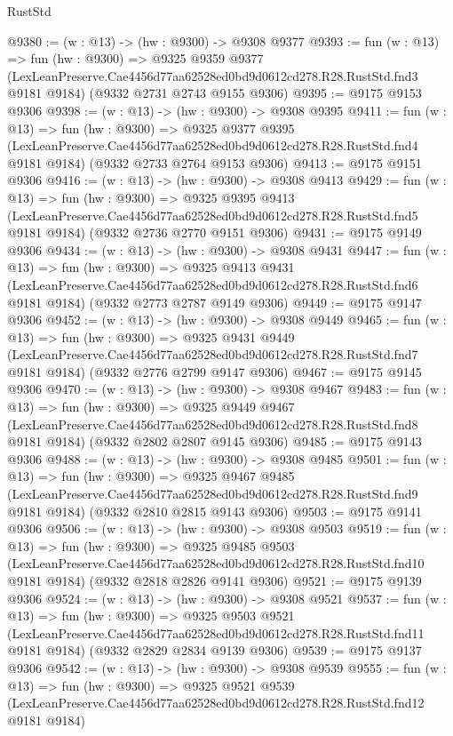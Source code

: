 \begin{lexlean}{RustStd}
\begin{coremodule}
@9380 := (w : @13) -> (hw : @9300) -> @9308 @9377
@9393 := fun (w : @13) =>
  fun (hw : @9300) =>
  @9325
    @9359
    @9377
    (LexLeanPreserve.Cae4456d77aa62528ed0bd9d0612cd278.R28.RustStd.fnd3 @9181 @9184)
    (@9332 @2731 @2743 @9155 @9306)
@9395 := @9175 @9153 @9306
@9398 := (w : @13) -> (hw : @9300) -> @9308 @9395
@9411 := fun (w : @13) =>
  fun (hw : @9300) =>
  @9325
    @9377
    @9395
    (LexLeanPreserve.Cae4456d77aa62528ed0bd9d0612cd278.R28.RustStd.fnd4 @9181 @9184)
    (@9332 @2733 @2764 @9153 @9306)
@9413 := @9175 @9151 @9306
@9416 := (w : @13) -> (hw : @9300) -> @9308 @9413
@9429 := fun (w : @13) =>
  fun (hw : @9300) =>
  @9325
    @9395
    @9413
    (LexLeanPreserve.Cae4456d77aa62528ed0bd9d0612cd278.R28.RustStd.fnd5 @9181 @9184)
    (@9332 @2736 @2770 @9151 @9306)
@9431 := @9175 @9149 @9306
@9434 := (w : @13) -> (hw : @9300) -> @9308 @9431
@9447 := fun (w : @13) =>
  fun (hw : @9300) =>
  @9325
    @9413
    @9431
    (LexLeanPreserve.Cae4456d77aa62528ed0bd9d0612cd278.R28.RustStd.fnd6 @9181 @9184)
    (@9332 @2773 @2787 @9149 @9306)
@9449 := @9175 @9147 @9306
@9452 := (w : @13) -> (hw : @9300) -> @9308 @9449
@9465 := fun (w : @13) =>
  fun (hw : @9300) =>
  @9325
    @9431
    @9449
    (LexLeanPreserve.Cae4456d77aa62528ed0bd9d0612cd278.R28.RustStd.fnd7 @9181 @9184)
    (@9332 @2776 @2799 @9147 @9306)
@9467 := @9175 @9145 @9306
@9470 := (w : @13) -> (hw : @9300) -> @9308 @9467
@9483 := fun (w : @13) =>
  fun (hw : @9300) =>
  @9325
    @9449
    @9467
    (LexLeanPreserve.Cae4456d77aa62528ed0bd9d0612cd278.R28.RustStd.fnd8 @9181 @9184)
    (@9332 @2802 @2807 @9145 @9306)
@9485 := @9175 @9143 @9306
@9488 := (w : @13) -> (hw : @9300) -> @9308 @9485
@9501 := fun (w : @13) =>
  fun (hw : @9300) =>
  @9325
    @9467
    @9485
    (LexLeanPreserve.Cae4456d77aa62528ed0bd9d0612cd278.R28.RustStd.fnd9 @9181 @9184)
    (@9332 @2810 @2815 @9143 @9306)
@9503 := @9175 @9141 @9306
@9506 := (w : @13) -> (hw : @9300) -> @9308 @9503
@9519 := fun (w : @13) =>
  fun (hw : @9300) =>
  @9325
    @9485
    @9503
    (LexLeanPreserve.Cae4456d77aa62528ed0bd9d0612cd278.R28.RustStd.fnd10 @9181 @9184)
    (@9332 @2818 @2826 @9141 @9306)
@9521 := @9175 @9139 @9306
@9524 := (w : @13) -> (hw : @9300) -> @9308 @9521
@9537 := fun (w : @13) =>
  fun (hw : @9300) =>
  @9325
    @9503
    @9521
    (LexLeanPreserve.Cae4456d77aa62528ed0bd9d0612cd278.R28.RustStd.fnd11 @9181 @9184)
    (@9332 @2829 @2834 @9139 @9306)
@9539 := @9175 @9137 @9306
@9542 := (w : @13) -> (hw : @9300) -> @9308 @9539
@9555 := fun (w : @13) =>
  fun (hw : @9300) =>
  @9325
    @9521
    @9539
    (LexLeanPreserve.Cae4456d77aa62528ed0bd9d0612cd278.R28.RustStd.fnd12 @9181 @9184)

\end{coremodule}
\end{lexlean}
